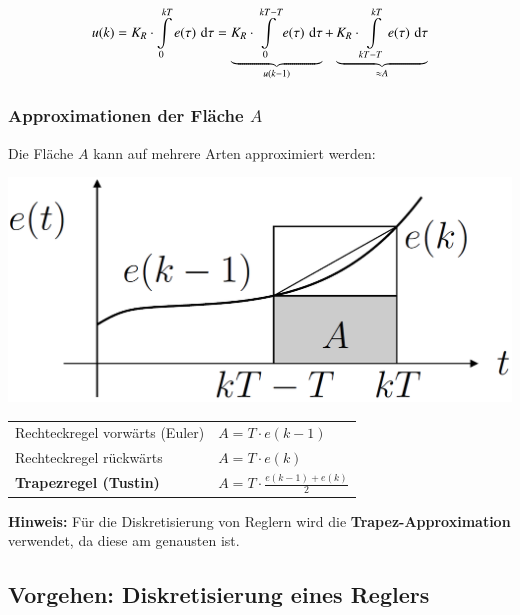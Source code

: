 $$ u(k) = K_R \cdot \int\limits_0^{kT} e(\tau) \, \mathop{} \! \mathrm{d} \tau
    = \underbrace{K_R \cdot \int\limits_0^{kT- T} e(\tau) \, \mathop{} \! \mathrm{d} \tau}_{u(k-1)} 
    + \underbrace{K_R \cdot \int\limits_{kT-T}^{kT} e(\tau) \, \mathop{} \! \mathrm{d} \tau}_{\approx A} $$


\subsubsection{Approximationen der Fläche $A$}

Die Fläche $A$ kann auf mehrere Arten approximiert werden:


\begin{minipage}[c]{0.3\columnwidth}
    \includegraphics[width=\columnwidth]{images/approximation_integration.png}
\end{minipage}
\hfill
\begin{minipage}[c]{0.68\columnwidth}
    \begin{tabular}{ll}
        Rechteckregel vorwärts (Euler)      & $ A = T \cdot e(k-1) $    \\
        Rechteckregel rückwärts             & $ A = T \cdot e(k)$       \\
        \textbf{Trapezregel (Tustin)}       & $ A = T \cdot \frac{e(k-1) + e(k)}{2} $ 
    \end{tabular}
\end{minipage}

\vspace{0.2cm}
\textbf{Hinweis:} Für die Diskretisierung von Reglern wird die \textbf{Trapez-Approximation} verwendet, da diese am genausten ist.


\subsection{Vorgehen: Diskretisierung eines Reglers}

